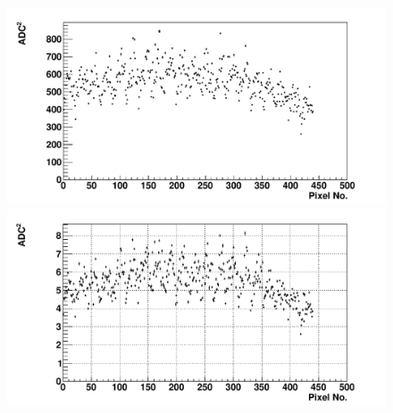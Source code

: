 \begin{figure} %
\includegraphics[width=\textwidth]{chapters/graphs/GainVarsMeas/LL_m04_2016-06-11/Set0and2/varianceHist_StandHV_Pairs_set0and2.pdf}
\caption{}
\vspace{3mm}
\includegraphics[width=\textwidth]{chapters/graphs/GainVarsMeas/LL_m04_2016-06-11/Set0and2/varianceHist_LowHV_Pairs_set0and2.pdf}
\caption{} \label{fig:CalAVarsADC_Pairs}
\end{figure}

